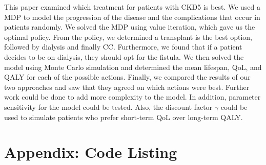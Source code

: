 \documentclass[10pt,twocolumn]{article}
\begin{document}
This paper examined which treatment for patients with CKD5 is best. We used a MDP to model the progression of the disease and the complications that occur in patients randomly. We solved the MDP using value iteration, which gave us the optimal policy. From the policy, we determined a transplant is the best option, followed by dialysis and finally CC. Furthermore, we found that if a patient decides to be on dialysis, they should opt for the fistula. We then solved the model using Monte Carlo simulation and determined the mean lifespan, QoL, and QALY for each of the possible actions. Finally, we compared the results of our two approaches and saw that they agreed on which actions were best. Further work could be done to add more complexity to the model. In addition, parameter sensitivity for the model could be tested. Also, the discount factor \(\gamma\) could be used to simulate patients who prefer short-term QoL over long-term QALY.

\pagebreak
\nocite{*}



\pagebreak

\appendix
\section*{Appendix: Code Listing}
\end{document}
